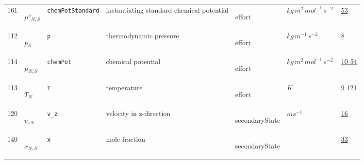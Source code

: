 \begin{longtable}{|p{1cm}|p{2.5cm}|p{4.5cm}|p{8cm}|p{3.0cm}|p{3cm}|p{1cm}|}
            161
             & \hypertarget{"v:161"}{ $ {{\mu^o}}{_{N, S}} $}
             & \verb|chemPotStandard|
             & instantiating standard chemical potential
             & \begin{lay}effort \end{lay}
             & $ kg \,m^{2} \,mol^{-1} \,s^{-2} \, $
             &                 \hyperlink{"e:53"}{ 53 }
                 \\
            112
             & \hypertarget{"v:112"}{ $ {p}{_{N}} $}
             & \verb|p|
             & thermodynamic pressure
             & \begin{lay}effort \end{lay}
             & $ kg \,m^{-1} \,s^{-2} \, $
             &                 \hyperlink{"e:8"}{ 8 }
                 \\
            114
             & \hypertarget{"v:114"}{ $ {{\mu}}{_{N, S}} $}
             & \verb|chemPot|
             & chemical potential
             & \begin{lay}effort \end{lay}
             & $ kg \,m^{2} \,mol^{-1} \,s^{-2} \, $
             &                 \hyperlink{"e:10"}{ 10 }
                                 \hyperlink{"e:54"}{ 54 }
                 \\
            113
             & \hypertarget{"v:113"}{ $ {T}{_{N}} $}
             & \verb|T|
             & temperature
             & \begin{lay}effort \end{lay}
             & $ K \, $
             &                 \hyperlink{"e:9"}{ 9 }
                                 \hyperlink{"e:121"}{ 121 }
                 \\
            120
             & \hypertarget{"v:120"}{ $ {{v_z}}{_{N}} $}
             & \verb|v_z|
             & velocity in z-direction
             & \begin{lay}secondaryState \end{lay}
             & $ m s^{-1} \, $
             &                 \hyperlink{"e:16"}{ 16 }
                 \\
            140
             & \hypertarget{"v:140"}{ $ {x}{_{N, S}} $}
             & \verb|x|
             & mole fraction
             & \begin{lay}secondaryState \end{lay}
             & $  $
             &                 \hyperlink{"e:33"}{ 33 }
                 \\

\end{longtable}
